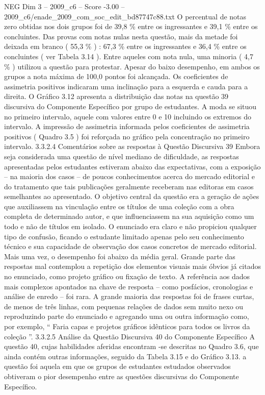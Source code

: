 \begin{textsample}{NEG Dim 3 – 2009\_c6 – Score -3.00 – 2009\_c6/enade\_2009\_com\_soc\_edit\_bd87747c88.txt}
O percentual de notas zero obtidas nos dois grupos foi de 39,8 \% entre os ingressantes e 39,1 \% entre os concluintes.
Das provas com notas nulas nesta questão, mais da metade foi deixada em branco ( 55,3 \% ) : 67,3 \% entre os ingressantes e 36,4 \% entre os concluintes ( ver Tabela 3.14 ).
Entre aqueles com nota nula, uma minoria ( 4,7 \% ) utilizou a questão para protestar.
Apesar do baixo desempenho, em ambos os grupos a nota máxima de 100,0 pontos foi alcançada.
Os coeficientes de assimetria positivos indicaram uma inclinação para a esquerda e cauda para a direita.
O Gráfico 3.12 apresenta a distribuição das notas na questão 39 discursiva do Componente Específico por grupo de estudantes.
A moda se situou no primeiro intervalo, aquele com valores entre 0 e 10 incluindo os extremos do intervalo.
A impressão de assimetria informada pelos coeficientes de assimetria positivos ( Quadro 3.5 ) foi reforçada no gráfico pela concentração no primeiro intervalo. 3.3.2.4 Comentários sobre as respostas à Questão Discursiva 39 Embora seja considerada uma questão de nível mediano de dificuldade, as respostas apresentadas pelos estudantes estiveram abaixo das expectativas, com a exposição – na maioria dos casos – de poucos conhecimentos acerca do mercado editorial e do tratamento que tais publicações geralmente receberam nas editoras em casos semelhantes ao apresentado.
O objetivo central da questão era a geração de ações que auxiliassem na vinculação entre os títulos de uma coleção com a obra completa de determinado autor, e que influenciassem na sua aquisição como um todo e não de títulos em isolado.
O enunciado era claro e não propiciou qualquer tipo de confusão, ficando o estudante limitado apenas pelo seu conhecimento técnico e sua capacidade de observação dos casos concretos de mercado editorial.
Mais uma vez, o desempenho foi abaixo da média geral.
Grande parte das respostas mal contemplou a repetição dos elementos visuais mais óbvios já citados no enunciado, como projeto gráfico ou fixação de texto.
A referência aos dados mais complexos apontados na chave de resposta – como posfácios, cronologias e análise de enredo – foi rara.
A grande maioria das respostas foi de frases curtas, de menos de três linhas, com pequenas relações de dados sem muito nexo ou reproduzindo parte do enunciado e agregando uma ou outra informação como, por exemplo, “ Faria capas e projetos gráficos idênticos para todos os livros da coleção ”. 3.3.2.5 Análise da Questão Discursiva 40 do Componente Específico A questão 40, cujas habilidades aferidas encontram -se descritas no Quadro 3.6, que ainda contém outras informações, seguido da Tabela 3.15 e do Gráfico 3.13. a questão foi aquela em que os grupos de estudantes estudados observados obtiveram o pior desempenho entre as questões discursivas do Componente Específico.

\end{textsample}
